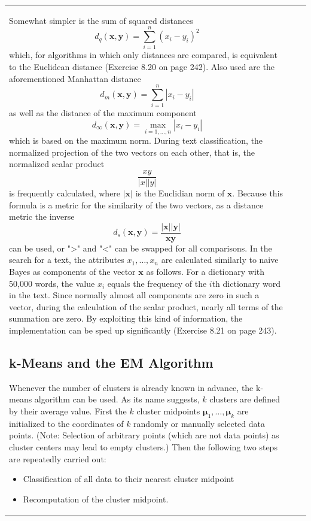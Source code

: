 \documentclass[10pt]{book}
\begin{document}
\begin{center}
\begin{tabular}{|l|l|l|}
Somewhat simpler is the sum of squared distances
$$
d_{q}(\boldsymbol{x}, \boldsymbol{y})=\sum_{i=1}^{n}\left(x_{i}-y_{i}\right)^{2}
$$
which, for algorithms in which only distances are compared, is equivalent to the Euclidean distance (Exercise 8.20 on page 242). Also used are the aforementioned Manhattan distance
$$
d_{m}(\boldsymbol{x}, \boldsymbol{y})=\sum_{i=1}^{n}\left|x_{i}-y_{i}\right|
$$
as well as the distance of the maximum component
$$
d_{\infty}(\boldsymbol{x}, \boldsymbol{y})=\max _{i=1, \ldots, n}\left|x_{i}-y_{i}\right|
$$
which is based on the maximum norm. During text classification, the normalized projection of the two vectors on each other, that is, the normalized scalar product
$$
\frac{x y}{|x||y|}
$$
is frequently calculated, where $|\boldsymbol{x}|$ is the Euclidian norm of $\boldsymbol{x}$. Because this formula is a metric for the similarity of the two vectors, as a distance metric the inverse
$$
d_{s}(\boldsymbol{x}, \boldsymbol{y})=\frac{|\boldsymbol{x}||\boldsymbol{y}|}{\boldsymbol{x} \boldsymbol{y}}
$$
can be used, or ">" and "<" can be swapped for all comparisons. In the search for a text, the attributes $x_{1}, \ldots, x_{n}$ are calculated similarly to naive Bayes as components of the vector $\boldsymbol{x}$ as follows. For a dictionary with 50,000 words, the value $x_{i}$ equals the frequency of the $i$th dictionary word in the text. Since normally almost all components are zero in such a vector, during the calculation of the scalar product, nearly all terms of the summation are zero. By exploiting this kind of information, the implementation can be sped up significantly (Exercise 8.21 on page 243).

\subsection{k-Means and the EM Algorithm}
Whenever the number of clusters is already known in advance, the k-means algorithm can be used. As its name suggests, $k$ clusters are defined by their average value. First the $k$ cluster midpoints $\boldsymbol{\mu}_{1}, \ldots, \boldsymbol{\mu}_{k}$ are initialized to the coordinates of $k$ randomly or manually selected data points. (Note: Selection of arbitrary points (which are not data points) as cluster centers may lead to empty clusters.) Then the following two steps are repeatedly carried out:
\begin{itemize}
  \item Classification of all data to their nearest cluster midpoint
  \item Recomputation of the cluster midpoint.
\end{itemize}


\end{tabular}
\end{center}
\end{document}
